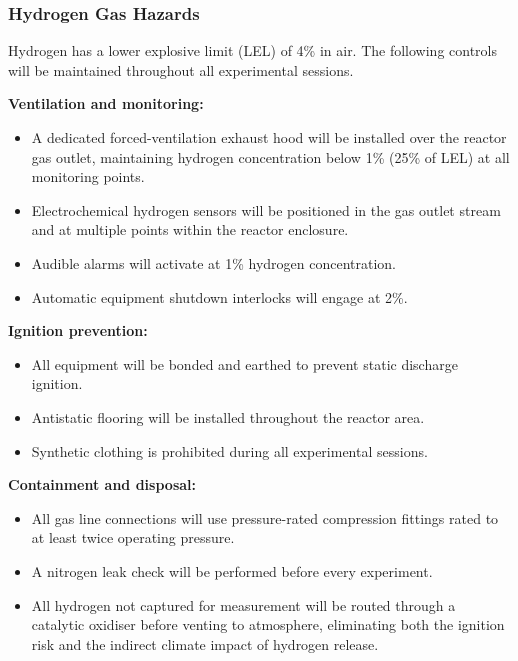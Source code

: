 \documentclass[12pt]{article}
\begin{document}
\subsubsection{Hydrogen Gas Hazards}

Hydrogen has a lower explosive limit (LEL) of 4\% in air. The following controls
will be maintained throughout all experimental sessions.

\medskip
\noindent\textbf{Ventilation and monitoring:}
\begin{itemize}[itemsep=3pt]
    \item A dedicated forced-ventilation exhaust hood will be installed over the
          reactor gas outlet, maintaining hydrogen concentration below 1\%
          (25\% of LEL) at all monitoring points.
    \item Electrochemical hydrogen sensors will be positioned in the gas outlet
          stream and at multiple points within the reactor enclosure.
    \item Audible alarms will activate at 1\% hydrogen concentration.
    \item Automatic equipment shutdown interlocks will engage at 2\%.
\end{itemize}

\medskip
\noindent\textbf{Ignition prevention:}
\begin{itemize}[itemsep=3pt]
    \item All equipment will be bonded and earthed to prevent static discharge
          ignition.
    \item Antistatic flooring will be installed throughout the reactor area.
    \item Synthetic clothing is prohibited during all experimental sessions.
\end{itemize}

\medskip
\noindent\textbf{Containment and disposal:}
\begin{itemize}[itemsep=3pt]
    \item All gas line connections will use pressure-rated compression fittings
          rated to at least twice operating pressure.
    \item A nitrogen leak check will be performed before every experiment.
    \item All hydrogen not captured for measurement will be routed through a
          catalytic oxidiser before venting to atmosphere, eliminating both the
          ignition risk and the indirect climate impact of hydrogen release.
\end{itemize}
\end{document}
